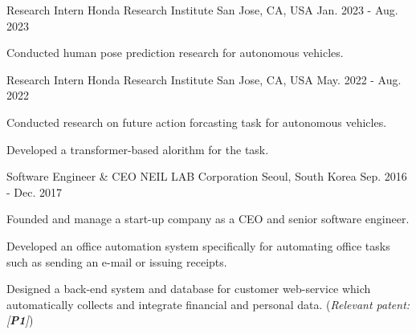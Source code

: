 


\begin{cventries}

\cventry
{Research Intern} %
{Honda Research Institute} %
{San Jose, CA, USA} %
{Jan. 2023 - Aug. 2023} %
{ %
\begin{cvitems}
\item {Conducted human pose prediction research for autonomous vehicles.}
\end{cvitems}
}

\cventry
{Research Intern} %
{Honda Research Institute} %
{San Jose, CA, USA} %
{May. 2022 - Aug. 2022} %
{ %
\begin{cvitems}
\item {Conducted research on future action forcasting task for autonomous vehicles.}
\item {Developed a transformer-based alorithm for the task.}
\end{cvitems}
}


\cventry
{Software Engineer \& CEO} %
{NEIL LAB Corporation} %
{Seoul, South Korea} %
{Sep. 2016 - Dec. 2017} %
{ %
\begin{cvitems}
\item {Founded and manage a start-up company as a CEO and senior software engineer.}
\item {Developed an office automation system specifically for automating office tasks such as sending an e-mail or issuing receipts.}
\item {Designed a back-end system and database for customer web-service which automatically collects and integrate financial and personal data. (\textit{Relevant patent: [\textbf{P1}]})}
\end{cvitems}
}



\end{cventries}
